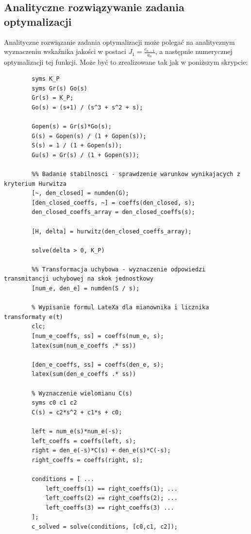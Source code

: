 \documentclass{article}
\begin{document}
    \subsection{Analityczne rozwiązywanie zadania optymalizacji}
    Analityczne rozwiązanie zadania optymalizacji może polegać na analitycznym wyznaczeniu wskaźnika jakości w postaci $J_{1} = \frac{c_{n-1}}{a_{n}}$, a następnie numerycznej optymalizacji tej funkcji.
    Może być to zrealizowane tak jak w poniższym skrypcie:
    \begin{lstlisting}[style=Matlab-editor]
        %% Definicja transmitancji - funkcja tf() nie obsluguje zmiennych symbolicznych
        syms K_P
        syms Gr(s) Go(s)
        Gr(s) = K_P;
        Go(s) = (s+1) / (s^3 + s^2 + s);
        
        Gopen(s) = Gr(s)*Go(s);
        G(s) = Gopen(s) / (1 + Gopen(s));
        S(s) = 1 / (1 + Gopen(s));
        Gu(s) = Gr(s) / (1 + Gopen(s));
        
        %% Badanie stabilnosci - sprawdzenie warunkow wynikajacych z kryterium Hurwitza
        [~, den_closed] = numden(G);
        [den_closed_coeffs, ~] = coeffs(den_closed, s);
        den_closed_coeffs_array = den_closed_coeffs(s);
        
        [H, delta] = hurwitz(den_closed_coeffs_array);
        
        solve(delta > 0, K_P)
        
        %% Transformacja uchybowa - wyznaczenie odpowiedzi transmitancji uchybowej na skok jednostkowy
        [num_e, den_e] = numden(S / s);

        % Wypisanie formul LateXa dla mianownika i licznika transformaty e(t)
        clc;
        [num_e_coeffs, ss] = coeffs(num_e, s);
        latex(sum(num_e_coeffs .* ss))
        
        [den_e_coeffs, ss] = coeffs(den_e, s);
        latex(sum(den_e_coeffs .* ss))

        % Wyznaczenie wielomianu C(s)
        syms c0 c1 c2
        C(s) = c2*s^2 + c1*s + c0;
        
        left = num_e(s)*num_e(-s);
        left_coeffs = coeffs(left, s);
        right = den_e(-s)*C(s) + den_e(s)*C(-s);
        right_coeffs = coeffs(right, s);
        
        conditions = [ ...
            left_coeffs(1) == right_coeffs(1); ...
            left_coeffs(2) == right_coeffs(2); ...
            left_coeffs(3) == right_coeffs(3) ...
        ];
        c_solved = solve(conditions, [c0,c1, c2]);


\end{lstlisting}
\end{document}
